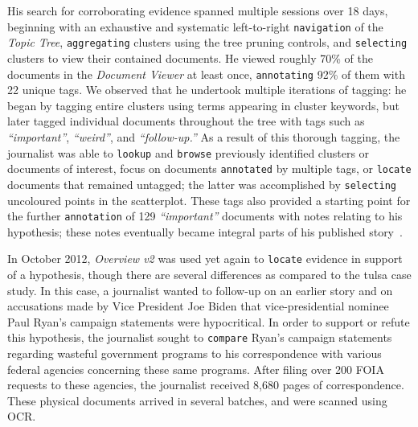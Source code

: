 His search for corroborating evidence spanned multiple sessions over 18 days, beginning with an exhaustive and systematic left-to-right {\tt navigation} of the {\it Topic Tree}, {\tt aggregating} clusters using the tree pruning controls, and {\tt selecting} clusters to view their contained documents.
He viewed roughly 70\% of the documents in the {\it Document Viewer} at least once, {\tt annotating} 92\% of them with 22 unique tags.
We observed that he undertook multiple iterations of tagging: he began by tagging entire clusters using terms appearing in cluster keywords, but later tagged individual documents throughout the tree with tags such as {\it ``important''}, {\it ``weird''}, and {\it ``follow-up.''}
As a result of this thorough tagging, the journalist was able to {\tt lookup} and {\tt browse} previously identified clusters or documents of interest, focus on documents {\tt annotated} by multiple tags, or {\tt locate} documents that remained untagged; the latter was accomplished by {\tt selecting} uncoloured points in the scatterplot.
These tags also provided a starting point for the further {\tt annotation} of 129 {\it ``important''} documents with notes relating to his hypothesis; these notes eventually became integral parts of his published story~\cite{Wade2012}.

In October 2012, {\it Overview v2} was used yet again to {\tt locate} evidence in support of a hypothesis, though there are several differences as compared to the {\sc tulsa} case study.
In this case, a journalist wanted to follow-up on an earlier story and on accusations made by Vice President Joe Biden that vice-presidential nominee Paul Ryan's campaign statements were hypocritical.
In order to support or refute this hypothesis, the journalist sought to {\tt compare} Ryan's campaign statements regarding wasteful government programs to his correspondence with various federal agencies concerning these same programs.
After filing over 200 \ac{FOIA} requests to these agencies, the journalist received 8,680 pages of correspondence.
These physical documents arrived in several batches, and were scanned using \ac{OCR}.

